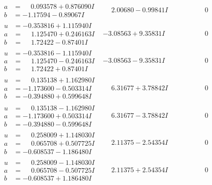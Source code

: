 \documentclass[1p]{elsarticle_modified}
\theoremstyle{definition}
\begin{document}
$$\begin{array}{c|c|c}
\begin{aligned}
a &= \phantom{-}0.093578 + 0.876090 I \\
b &= -1.17594 - 0.89067 I\end{aligned}
 & \phantom{-}2.00680 - 0.99841 I & \phantom{-0.000000 } 0 \\ \hline\begin{aligned}
u &= -0.353816 + 1.115940 I \\
a &= \phantom{-}1.125470 + 0.246163 I \\
b &= \phantom{-}1.72422 - 0.87401 I\end{aligned}
 & -3.08563 + 9.35831 I & \phantom{-0.000000 } 0 \\ \hline\begin{aligned}
u &= -0.353816 - 1.115940 I \\
a &= \phantom{-}1.125470 - 0.246163 I \\
b &= \phantom{-}1.72422 + 0.87401 I\end{aligned}
 & -3.08563 - 9.35831 I & \phantom{-0.000000 } 0 \\ \hline\begin{aligned}
u &= \phantom{-}0.135138 + 1.162980 I \\
a &= -1.173600 - 0.503314 I \\
b &= -0.394880 + 0.599648 I\end{aligned}
 & \phantom{-}6.31677 + 3.78842 I & \phantom{-0.000000 } 0 \\ \hline\begin{aligned}
u &= \phantom{-}0.135138 - 1.162980 I \\
a &= -1.173600 + 0.503314 I \\
b &= -0.394880 - 0.599648 I\end{aligned}
 & \phantom{-}6.31677 - 3.78842 I & \phantom{-0.000000 } 0 \\ \hline\begin{aligned}
u &= \phantom{-}0.258009 + 1.148030 I \\
a &= \phantom{-}0.065708 + 0.507725 I \\
b &= -0.608537 - 1.186480 I\end{aligned}
 & \phantom{-}2.11375 - 2.54354 I & \phantom{-0.000000 } 0 \\ \hline\begin{aligned}
u &= \phantom{-}0.258009 - 1.148030 I \\
a &= \phantom{-}0.065708 - 0.507725 I \\
b &= -0.608537 + 1.186480 I\end{aligned}
 & \phantom{-}2.11375 + 2.54354 I & \phantom{-0.000000 } 0 \\ \hline\begin{aligned}

\end{aligned}
\end{array}$$
\end{document}
